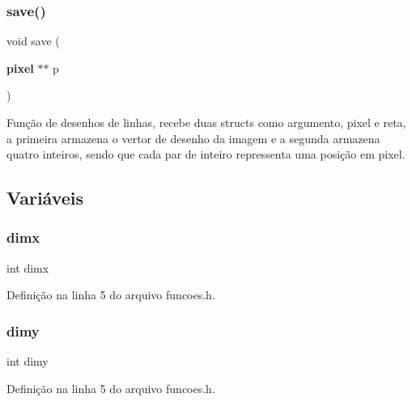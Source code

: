 \subsubsection{save()}
{\footnotesize\ttfamily void save (\begin{DoxyParamCaption}\item[{\textbf{ pixel} $\ast$$\ast$}]{p }\end{DoxyParamCaption})}



Função de desenhos de linhas, recebe duas structs como argumento, pixel e reta, a primeira armazena o vertor de desenho da imagem e a segunda armazena quatro inteiros, sendo que cada par de inteiro repressenta uma posição em pixel. 



\subsection{Variáveis}
\mbox{\label{funcoes_8h_a8b0f6ae031a507c3ffb7bf0eec290d46}} 
\subsubsection{dimx}
{\footnotesize\ttfamily int dimx}



Definição na linha 5 do arquivo funcoes.\+h.

\mbox{\label{funcoes_8h_a3a072d6ef9c51d085b44eac70f2edff6}} 
\subsubsection{dimy}
{\footnotesize\ttfamily int dimy}



Definição na linha 5 do arquivo funcoes.\+h.

